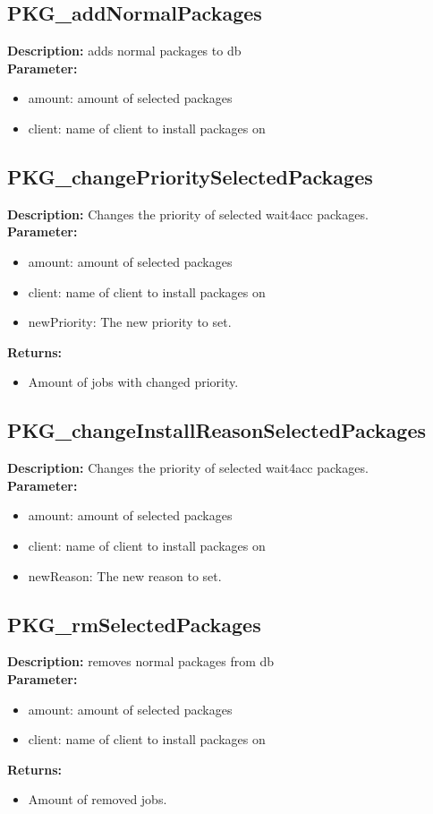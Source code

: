 \subsection{PKG\_addNormalPackages}
\textbf{Description:} adds normal packages to db\\
\textbf{Parameter:}
\begin{itemize}
\item amount: amount of selected packages
\item client: name of client to install packages on
\end{itemize}

\subsection{PKG\_changePrioritySelectedPackages}
\textbf{Description:} Changes the priority of selected wait4acc packages.\\
\textbf{Parameter:}
\begin{itemize}
\item amount: amount of selected packages
\item client: name of client to install packages on
\item newPriority: The new priority to set.
\end{itemize}
\textbf{Returns:}
\begin{itemize}
\item Amount of jobs with changed priority.
\end{itemize}

\subsection{PKG\_changeInstallReasonSelectedPackages}
\textbf{Description:} Changes the priority of selected wait4acc packages.\\
\textbf{Parameter:}
\begin{itemize}
\item amount: amount of selected packages
\item client: name of client to install packages on
\item newReason: The new reason to set.
\end{itemize}

\subsection{PKG\_rmSelectedPackages}
\textbf{Description:} removes normal packages from db\\
\textbf{Parameter:}
\begin{itemize}
\item amount: amount of selected packages
\item client: name of client to install packages on
\end{itemize}
\textbf{Returns:}
\begin{itemize}
\item Amount of removed jobs.
\end{itemize}

